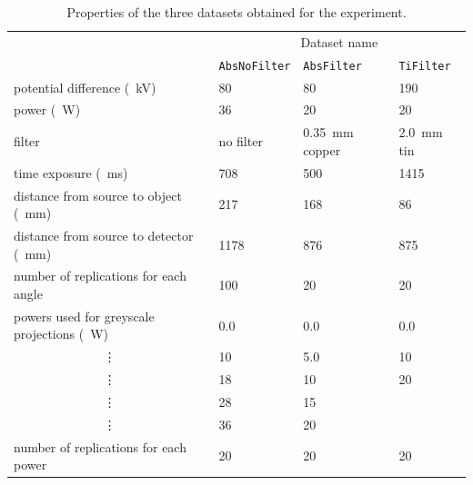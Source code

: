\begin{table}
\centering
\begin{tabular}{l|lll}
                                                       & \multicolumn{3}{c}{Dataset name}                                                \\
                                                       & \texttt{AbsNoFilter} & \texttt{AbsFilter}             & \texttt{TiFilter}        \\ \hline
potential difference (\SI{}{\kilo\volt})               & 80                   & 80                             & 190                      \\
power (\SI{}{\watt})                                   & 36                   & 20                             & 20                       \\
filter                                                 & no filter            & \SI{0.35}{\milli\metre} copper & \SI{2.0}{\milli\metre} tin \\
time exposure (\SI{}{\milli\second})                   & 708                  & 500                            & 1415                     \\
distance from source to object (\SI{}{\milli\metre})   & 217                  & 168                            & 86                       \\
distance from source to detector (\SI{}{\milli\metre}) & 1178                 & 876                            & 875                      \\
number of replications for each angle                  & 100                  & 20                             & 20                       \\ \hline
powers used for greyscale projections (\SI{}{\watt})   & 0.0                  & 0.0                            & 0.0                      \\
\multicolumn{1}{c|}{\vdots}                            & 10                   & 5.0                            & 10                       \\
\multicolumn{1}{c|}{\vdots}                            & 18                   & 10                             & 20                       \\
\multicolumn{1}{c|}{\vdots}                            & 28                   & 15                             &                          \\
\multicolumn{1}{c|}{\vdots}                            & 36                   & 20                             &                          \\
number of replications for each power                  & 20                   & 20                             & 20                    
\end{tabular}
\caption{Properties of the three datasets obtained for the experiment.}
\label{table:data_dataset}
\end{table}

